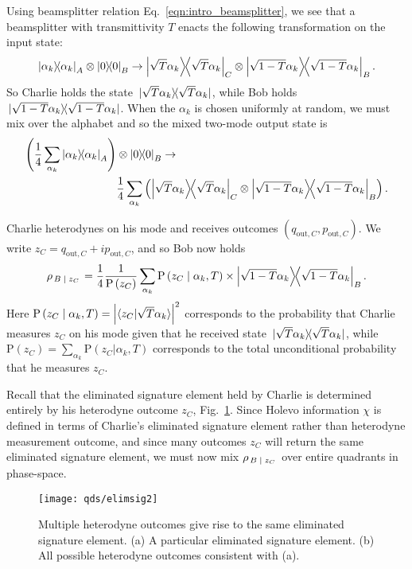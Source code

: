 Using beamsplitter relation Eq.~\ref{eqn:intro_beamsplitter}, we see that a beamsplitter with transmittivity $T$ enacts the following transformation on the input state:
\begin{equation}
\dyad{\alpha_k}_A \otimes \dyad{0}_B \rightarrow \dyad{\sqrt{T} \alpha_k}_C \otimes \dyad{\sqrt{1-T}\alpha_k}_{B}.
\end{equation}
So Charlie holds the state $\dyad*{\sqrt{T}\alpha_k}$, while Bob holds $\dyad*{\sqrt{1-T}\alpha_k}$. When the $\alpha_k$ is chosen uniformly at random, we must mix over the alphabet and so the mixed two-mode output state is
\begin{align}\label{eqn:qds_after_channel}
\left(\frac{1}{4}\sum_{\alpha_k} \dyad{\alpha_k}_A\right) &\otimes \dyad{0}_B \rightarrow \notag \\
&\frac{1}{4}\sum_{\alpha_k} \left(\dyad{\sqrt{T}\alpha_k}_C \otimes \dyad{\sqrt{1-T}\alpha_k}_B\right).
\end{align}

\noindent Charlie heterodynes on his mode and receives outcomes $\left(q_{\text{out}, C}, p_{\text{out}, C} \right)$. We write $z_C = q_{\text{out}, C} + i p_{\text{out}, C}$, and so Bob now holds
\begin{equation}\label{eqn:qds_bob_conditional_state}
\rho_{\left. B \given z_C \right.} = \frac{1}{4}\frac{1}{\text{P}\left(z_C\right)}\sum_{\alpha_k} \text{P}\left(z_C \given \alpha_k, T\right) \times \dyad{\sqrt{1-T}\alpha_k}_B.
\end{equation}
Here $\text{P}\left(z_C \; \middle| \; \alpha_k, T\right) = \left| \langle z_C | \sqrt{T}\alpha_k\rangle \right|^2$ corresponds to the probability that Charlie measures $z_C$ on his mode given that he received state $\dyad*{\sqrt{T}\alpha_k}$, while $\text{P}\left(z_C\right) = \sum_{\alpha_k} \text{P}\left(z_C | \alpha_k, T\right)$ corresponds to the total unconditional probability that he measures $z_C$.

Recall that the eliminated signature element held by Charlie is determined entirely by his heterodyne outcome $z_C$, Fig.~\ref{fig:qds_elimsig2}. Since Holevo information $\chi$ is defined in terms of Charlie's eliminated signature element rather than heterodyne measurement outcome, and since many outcomes $z_C$ will return the same eliminated signature element, we must now mix $\rho_{\left. B \; \middle| \; z_C \right.}$ over entire quadrants in phase-space.

\begin{figure}[htp]
\captionsetup{width=0.8\linewidth}
\centering
\texttt{[image: qds/elimsig2]}
\caption{\label{fig:qds_elimsig2} Multiple heterodyne outcomes give rise to the same eliminated signature element. (a) A particular eliminated signature element. (b) All possible heterodyne outcomes consistent with (a).}
\end{figure}



